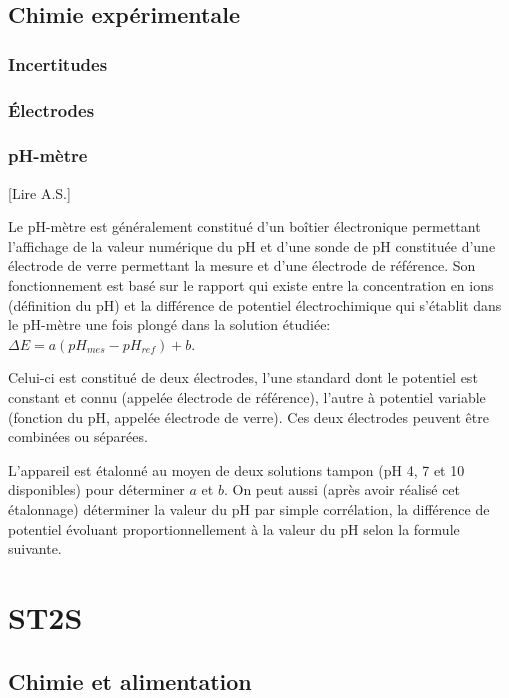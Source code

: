 \documentclass[11pt]{report}
\numberwithin{figure}{section}
\numberwithin{equation}{section}
\numberwithin{table}{section}
\newcommand{\1}{\boldsymbol{1}}
\begin{document}
\chapter*{Chimie expérimentale}

\section*{Incertitudes}

\section*{Électrodes}


\section*{pH-mètre}

[Lire A.S.]

Le pH-mètre est généralement constitué d'un boîtier électronique permettant l'affichage de la valeur numérique du pH et d'une sonde de pH constituée d'une électrode de verre permettant la mesure et d'une électrode de référence. Son fonctionnement est basé sur le rapport qui existe entre la concentration en ions  (définition du pH) et la différence de potentiel électrochimique qui s'établit dans le pH-mètre une fois plongé dans la solution étudiée: $\Delta E = a(pH_{mes} -pH_{ref})+ b$.

Celui-ci est constitué de deux électrodes, l'une standard dont le potentiel est constant et connu (appelée électrode de référence), l'autre à potentiel variable (fonction du pH, appelée électrode de verre). Ces deux électrodes peuvent être combinées ou séparées.

L'appareil est étalonné au moyen de deux solutions tampon (pH 4, 7 et 10 disponibles) pour déterminer $a$ et $b$. On peut aussi (après avoir réalisé cet étalonnage) déterminer la valeur du pH par simple corrélation, la différence de potentiel évoluant proportionnellement à la valeur du pH selon la formule suivante.



\part{ST2S}


\chapter{Chimie et alimentation}
\end{document}
